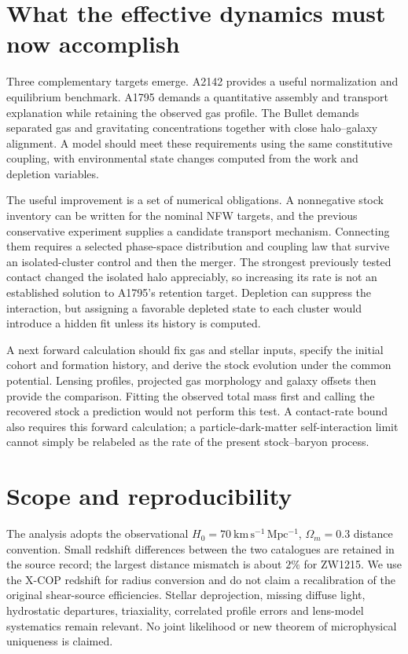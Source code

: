 \documentclass[11pt]{article}
\begin{document}
\clearpage
\section{What the effective dynamics must now accomplish}
Three complementary targets emerge. A2142 provides a useful normalization and equilibrium benchmark. A1795 demands a quantitative assembly and transport explanation while retaining the observed gas profile. The Bullet demands separated gas and gravitating concentrations together with close halo--galaxy alignment. A model should meet these requirements using the same constitutive coupling, with environmental state changes computed from the work and depletion variables.

The useful improvement is a set of numerical obligations. A nonnegative stock inventory can be written for the nominal NFW targets, and the previous conservative experiment supplies a candidate transport mechanism. Connecting them requires a selected phase-space distribution and coupling law that survive an isolated-cluster control and then the merger. The strongest previously tested contact changed the isolated halo appreciably, so increasing its rate is not an established solution to A1795's retention target. Depletion can suppress the interaction, but assigning a favorable depleted state to each cluster would introduce a hidden fit unless its history is computed.

A next forward calculation should fix gas and stellar inputs, specify the initial cohort and formation history, and derive the stock evolution under the common potential. Lensing profiles, projected gas morphology and galaxy offsets then provide the comparison. Fitting the observed total mass first and calling the recovered stock a prediction would not perform this test. A contact-rate bound also requires this forward calculation; a particle-dark-matter self-interaction limit cannot simply be relabeled as the rate of the present stock--baryon process.

\section{Scope and reproducibility}
The analysis adopts the observational $H_0=70\ \mathrm{km\,s^{-1}\,Mpc^{-1}}$, $\Omega_m=0.3$ distance convention. Small redshift differences between the two catalogues are retained in the source record; the largest distance mismatch is about $2\%$ for ZW1215. We use the X-COP redshift for radius conversion and do not claim a recalibration of the original shear-source efficiencies. Stellar deprojection, missing diffuse light, hydrostatic departures, triaxiality, correlated profile errors and lens-model systematics remain relevant. No joint likelihood or new theorem of microphysical uniqueness is claimed.
\end{document}
